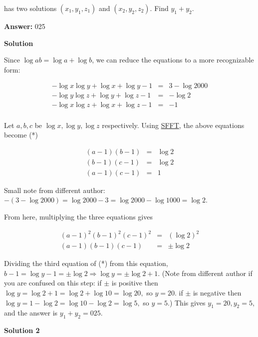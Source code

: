 \begin{enumerate}
 has two solutions $(x_{1},y_{1},z_{1})$ and $(x_{2},y_{2},z_{2})$. Find $y_{1} + y_{2}$.


 
 \textbf{Answer: }025



\textbf{Solution}

Since $\log ab = \log a + \log b$, we can reduce the equations to a more recognizable form:

 
 \begin{eqnarray*} -\log x \log y + \log x + \log y - 1 &=& 3 - \log 2000\\ -\log y \log z + \log y + \log z - 1 &=& - \log 2\\ -\log x \log z + \log x + \log z - 1 &=& -1\\ \end{eqnarray*}

 Let $a,b,c$ be $\log x, \log y, \log z$ respectively. Using \href{https://artofproblemsolving.com/wiki/index.php?title=Simon\%27s\_Favorite\_Factoring\_Trick}{SFFT}, the above equations become (*)

 
 \begin{eqnarray*}(a - 1)(b - 1) &=& \log 2 \\ (b-1)(c-1) &=& \log 2 \\ (a-1)(c-1) &=& 1  \end{eqnarray*}

 Small note from different author: $-(3 - \log 2000) = \log 2000 - 3 = \log 2000 - \log 1000 = \log 2.$

 From here, multiplying the three equations gives 

 
 \begin{eqnarray*}(a-1)^2(b-1)^2(c-1)^2 &=& (\log 2)^2\\ (a-1)(b-1)(c-1) &=& \pm\log 2\end{eqnarray*}

 Dividing the third equation of (*) from this equation, $b-1 = \log y - 1 = \pm\log 2 \Longrightarrow \log y = \pm \log 2 + 1$. (Note from different author if you are confused on this step: if $\pm$ is positive then $\log y = \log 2 + 1 = \log 2 + \log 10 = \log 20,$ so $y=20.$ if $\pm$ is negative then $\log y = 1 - \log 2 = \log 10 - \log 2 = \log 5,$ so $y=5.$) This gives $y_1 = 20, y_2 = 5$, and the answer is $y_1 + y_2 = \boxed{025}$.

 



\textbf{Solution 2}


\end{enumerate}
